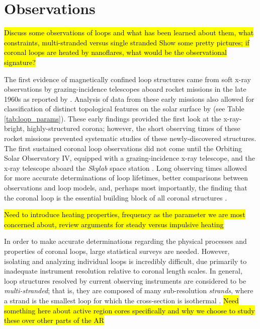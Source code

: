 \section{Observations}
\label{sec:observations}
\hl{Discuss some observations of loops and what has been learned about them, what constraints, multi-stranded versus single stranded
Show some pretty pictures; if coronal loops are heated by nanoflares, what would be the observational signature?}
%
\par The first evidence of magnetically confined loop structures came from soft x-ray observations by grazing-incidence telescopes aboard rocket missions in the late 1960s as reported by \citet{vaiana_x-ray_1968}. Analysis of data from these early missions also allowed for classification of distinct topological features on the solar surface by \citet{vaiana_identification_1973} (see Table \ref{tab:loop_params}). These early findings provided the first look at the x-ray-bright, highly-structured corona; however, the short observing times of these rocket missions prevented systematic studies of these newly-discovered structures. The first sustained coronal loop observations did not come until the Orbiting Solar Observatory IV, equipped with a grazing-incidence x-ray telescope, and the x-ray telescope aboard the \textit{Skylab} space station \citep{krieger_results_1972,reale_coronal_2010}. Long observing times allowed for more accurate determinations of loop lifetimes, better comparisons between observations and loop models, and, perhaps most importantly, the finding that the coronal loop is the essential building block of all coronal structures \citep{rosner_dynamics_1978}. 
%
\par \hl{Need to introduce heating properties, frequency as the parameter we are most concerned about, review arguments for steady versus impulsive heating}
%
\par In order to make accurate determinations regarding the physical processes and properties of coronal loops, large statistical surveys are needed. However, isolating and analyzing individual loops is incredibly difficult, due primarily to inadequate instrument resolution relative to coronal length scales. In general, loop structures resolved by current observing instruments are considered to be \textit{multi-stranded}; that is, they are composed of many sub-resolution \textit{strands}, where a strand is the smallest loop for which the cross-section is isothermal \citep{bradshaw_diagnosing_2012}. 
%
\hl{Need something here about active region cores specifically and why we choose to study these over other parts of the AR}
%
